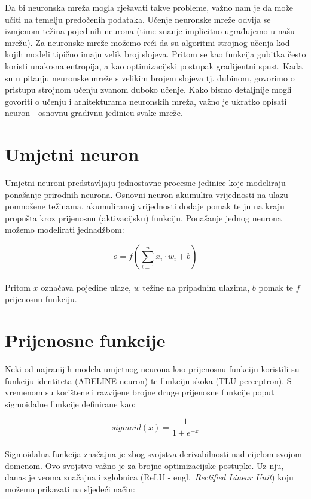 \documentclass[times, utf8, zavrsni, numeric]{fer}
\begin{document}
Da bi neuronska mreža mogla rješavati takve probleme, važno nam je da može učiti na temelju predočenih podataka. Učenje neuronske mreže odvija se izmjenom težina pojedinih neurona (time znanje implicitno ugrađujemo u našu mrežu).
Za neuronske mreže možemo reći da su algoritmi strojnog učenja kod kojih modeli tipično imaju velik broj slojeva. Pritom se kao funkcija gubitka često koristi unakrsna entropija, a kao optimizacijski postupak gradijentni spust.
Kada su u pitanju neuronske mreže s velikim brojem slojeva tj. dubinom, govorimo o pristupu strojnom učenju zvanom duboko učenje. %
Kako bismo detaljnije mogli govoriti o učenju i arhitekturama neuronskih mreža, važno je ukratko opisati neuron - osnovnu gradivnu jedinicu svake mreže.
\pagebreak
\section{Umjetni neuron}
Umjetni neuroni predstavljaju jednostavne procesne jedinice koje modeliraju ponašanje prirodnih neurona. Osnovni neuron akumulira vrijednosti na ulazu pomnožene težinama, 
akumuliranoj vrijednosti dodaje pomak te ju na kraju propušta kroz prijenosnu (aktivacijsku) funkciju. Ponašanje jednog neurona možemo modelirati jednadžbom:

\begin{equation}
    o = f(\sum_{i=1}^{n}x_{i} \cdot w_{i} + b)
    \label{eq:neuron}
\end{equation}
\\
\noindent Pritom $x$ označava pojedine ulaze, $w$ težine na pripadnim ulazima, $b$ pomak te $f$ prijenosnu funkciju. 

\section{Prijenosne funkcije}
Neki od najranijih modela umjetnog neurona kao prijenosnu funkciju koristili su funkciju identiteta (ADELINE-neuron) te funkciju skoka (TLU-perceptron).
S vremenom su korištene i razvijene brojne druge prijenosne funkcije poput sigmoidalne funkcije definirane kao:

\begin{equation}
    sigmoid(x) = \frac{1}{1 + e^{-x}}
    \label{eq:sigmoid}
\end{equation}
\\
Sigmoidalna funkcija značajna je zbog svojstva derivabilnosti nad cijelom svojom domenom. Ovo svojstvo važno je za brojne optimizacijske postupke.
Uz nju, danas je veoma značajna i zglobnica (ReLU - engl.\ \textit{Rectified Linear Unit}) koju možemo prikazati na sljedeći način:
\end{document}
